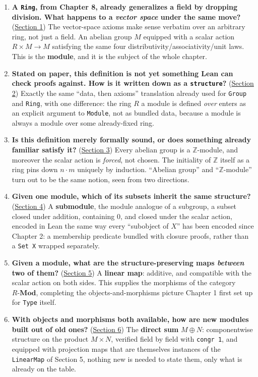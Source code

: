 \begin{enumerate}
\def\labelenumi{\arabic{enumi}.}
\tightlist
\item
  \textbf{A \texttt{Ring}, from Chapter 8, already generalizes a field by dropping division. What happens to a \emph{vector space} under the same move?} (\hyperref[sec:10-modules:01-definition:1]{Section 1}) The vector-space axioms make sense verbatim over an arbitrary ring, not just a field. An abelian group \(M\) equipped with a scalar action \(R \times M \to M\) satisfying the same four distributivity/associativity/unit laws. This is the \textbf{module}, and it is the subject of the whole chapter.
\item
  \textbf{Stated on paper, this definition is not yet something Lean can check proofs against. How is it written down as a \texttt{structure}?} (\hyperref[sec:10-modules:02-translating-into-lean:1]{Section 2}) Exactly the same ``data, then axioms'' translation already used for \texttt{Group} and \texttt{Ring}, with one difference: the ring \(R\) a module is defined \emph{over} enters as an explicit argument to \texttt{Module}, not as bundled data, because a module is always a module over some already-fixed ring.
\item
  \textbf{Is this definition merely formally sound, or does something already familiar satisfy it?} (\hyperref[sec:10-modules:03-z-module-example:1]{Section 3}) Every abelian group is a \(\mathbb{Z}\)-module, and moreover the scalar action is \emph{forced}, not chosen. The initiality of \(\mathbb{Z}\) itself as a ring pins down \(n \cdot m\) uniquely by induction. ``Abelian group'' and ``\(\mathbb{Z}\)-module'' turn out to be the same notion, seen from two directions.
\item
  \textbf{Given one module, which of its subsets inherit the same structure?} (\hyperref[sec:10-modules:04-submodules:1]{Section 4}) A \textbf{submodule}, the module analogue of a subgroup, a subset closed under addition, containing \(0\), and closed under the scalar action, encoded in Lean the same way every ``subobject of \(X\)'' has been encoded since Chapter 2: a membership predicate bundled with closure proofs, rather than a \texttt{Set X} wrapped separately.
\item
  \textbf{Given a module, what are the structure-preserving maps \emph{between} two of them?} (\hyperref[sec:10-modules:05-linear-maps:1]{Section 5}) A \textbf{linear map}: additive, and compatible with the scalar action on both sides. This supplies the morphisms of the category \(R\text{-}\mathbf{Mod}\), completing the objects-and-morphisms picture Chapter 1 first set up for \texttt{Type} itself.
\item
  \textbf{With objects and morphisms both available, how are new modules built out of old ones?} (\hyperref[sec:10-modules:06-direct-sums:1]{Section 6}) The \textbf{direct sum} \(M \oplus N\): componentwise structure on the product \(M \times N\), verified field by field with \texttt{congr 1}, and equipped with projection maps that are themselves instances of the \texttt{LinearMap} of Section 5, nothing new is needed to state them, only what is already on the table.
\end{enumerate}

